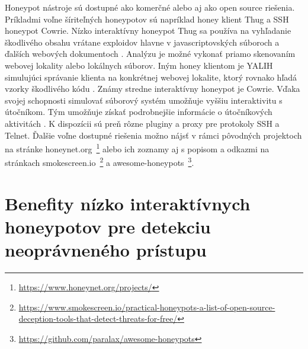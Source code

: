 \documentclass[conference, 11pt,slovak,a4paper,twoside]{IEEEtran}
\begin{document}
Honeypot nástroje sú dostupné ako komerčné alebo aj ako open source riešenia. Príkladmi voľne šíriteľných honeypotov sú napríklad honey klient Thug a SSH honeypot Cowrie. Nízko interaktívny honeypot Thug sa používa na vyhľadanie škodlivého obsahu vrátane exploidov hlavne v javascriptovských súboroch a ďalších webových dokumentoch \cite{zulkurnain_analysis_2018}. Analýzu je možné vykonať priamo skenovaním webovej lokality alebo lokálnych súborov. Iným honey klientom je YALIH simulujúci správanie klienta na konkrétnej webovej lokalite, ktorý rovnako hľadá vzorky škodlivého kódu \cite{mansoori_yalih_2014}. Známy stredne interaktívny honeypot je Cowrie. Vďaka svojej schopnosti simulovať súborový systém umožňuje vyššiu interaktivitu s útočníkom. Tým umožňuje získať podrobnejšie informácie o útočníkových aktivitách \cite{cabral_review_2019}. K dispozícii sú preň rôzne pluginy a proxy pre protokoly SSH a Telnet. Ďalšie voľne dostupné riešenia možno nájsť v rámci pôvodných projektoch na stránke honeynet.org~\footnote{\url{https://www.honeynet.org/projects/}} alebo ich zoznamy aj s popisom a odkazmi na stránkach smokescreen.io~\footnote{\url{https://www.smokescreen.io/practical-honeypots-a-list-of-open-source-deception-tools-that-detect-threats-for-free/}}\cite{smokescreen_team_open_nodate} a awesome-honeypots~\footnote{\url{https://github.com/paralax/awesome-honeypots}}.   



\section{Benefity nízko interaktívnych honeypotov pre detekciu neoprávneného prístupu}
\end{document}
